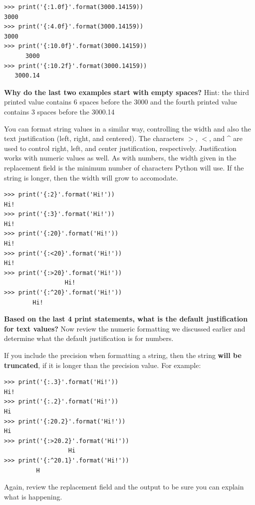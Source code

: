 \beforeverb
\begin{verbatim}
>>> print('{:1.0f}'.format(3000.14159))
3000
>>> print('{:4.0f}'.format(3000.14159))
3000
>>> print('{:10.0f}'.format(3000.14159))
      3000
>>> print('{:10.2f}'.format(3000.14159))
   3000.14
\end{verbatim}
\afterverb
%

{\bf Why do the last two examples start with empty spaces?} Hint: the third printed value contains 6 spaces before the 3000 and the fourth printed value contains 3 spaces before the 3000.14

You can format string values in a similar way, controlling the width and also the text justification (left, right, and centered). The characters \textbf{$>$}, \textbf{$<$}, and \textbf{\^} are used to control right, left, and center justification, respectively. Justification works with numeric values as well. As with numbers, the width given in the replacement field is the minimum number of characters Python will use. If the string is longer, then the width will grow to accomodate.

\newpage

\beforeverb
\begin{verbatim}
>>> print('{:2}'.format('Hi!'))
Hi!
>>> print('{:3}'.format('Hi!'))
Hi!
>>> print('{:20}'.format('Hi!'))
Hi!                 
>>> print('{:<20}'.format('Hi!'))
Hi!                 
>>> print('{:>20}'.format('Hi!'))
                 Hi!
>>> print('{:^20}'.format('Hi!'))
        Hi!         
\end{verbatim}
\afterverb
%

{\bf Based on the last 4 print statements, what is the default justification for text values?} Now review the numeric formatting we discussed earlier and determine what the default justification is for numbers.

If you include the precision when formatting a string, then the string {\bf will be truncated}, if it is longer than the precision value. For example:


\beforeverb
\begin{verbatim}
>>> print('{:.3}'.format('Hi!'))
Hi!
>>> print('{:.2}'.format('Hi!'))
Hi
>>> print('{:20.2}'.format('Hi!'))
Hi                  
>>> print('{:>20.2}'.format('Hi!'))
                  Hi
>>> print('{:^20.1}'.format('Hi!'))
         H
\end{verbatim}
\afterverb
%

Again, review the replacement field and the output to be sure you can explain what is happening.

